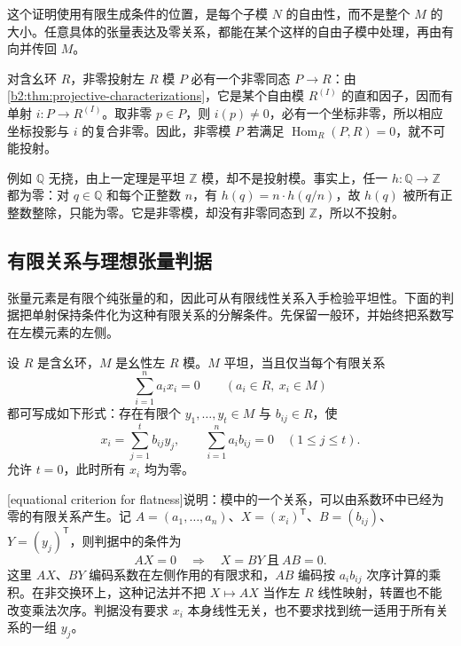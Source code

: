这个证明使用有限生成条件的位置，是每个子模 \(N\) 的自由性，而不是整个 \(M\) 的大小。任意具体的张量表达及零关系，都能在某个这样的自由子模中处理，再由有向并传回 \(M\)。

\ProseParagraphBreak
对含幺环 \(R\)，非零投射左 \(R\) 模 \(P\) 必有一个非零同态 \(P\to R\)：由\cref{b2:thm:projective-characterizations}，它是某个自由模 \(R^{(I)}\) 的直和因子，因而有单射 \(i:P\to R^{(I)}\)。取非零 \(p\in P\)，则 \(i(p)\ne0\)，必有一个坐标非零，所以相应坐标投影与 \(i\) 的复合非零。因此，非零模 \(P\) 若满足 \(\operatorname{Hom}_R(P,R)=0\)，就不可能投射。

\ProseParagraphBreak
例如 \(\mathbb Q\) 无挠，由上一定理是平坦 \(\mathbb Z\) 模，却不是投射模。事实上，任一 \(h:\mathbb Q\to\mathbb Z\) 都为零：对 \(q\in\mathbb Q\) 和每个正整数 \(n\)，有 \(h(q)=n\cdot h(q/n)\)，故 \(h(q)\) 被所有正整数整除，只能为零。它是非零模，却没有非零同态到 \(\mathbb Z\)，所以不投射。

\subsection{有限关系与理想张量判据}
\label{b2:subsec:0703:04}

张量元素是有限个纯张量的和，因此可从有限线性关系入手检验平坦性。下面的判据把单射保持条件化为这种有限关系的分解条件。先保留一般环，并始终把系数写在左模元素的左侧。

\begin{theorem}[有限关系判据]\label{b2:thm:flat-finite-relations}
	设 \(R\) 是含幺环，\(M\) 是幺性左 \(R\) 模。\(M\) 平坦，当且仅当每个有限关系
	\[
		\sum_{i=1}^n a_i x_i=0\qquad(a_i\in R,\ x_i\in M)
	\]
	都可写成如下形式：存在有限个 \(y_1,\ldots,y_t\in M\) 与 \(b_{ij}\in R\)，使
	\begin{equation}\label{b2:eq:flat-relation-factorization}
		x_i=\sum_{j=1}^t b_{ij}y_j,\qquad \sum_{i=1}^n a_i b_{ij}=0\quad(1\le j\le t).
	\end{equation}
	允许 \(t=0\)，此时所有 \(x_i\) 均为零。
\end{theorem}

[equational criterion for flatness]说明：模中的一个关系，可以由系数环中已经为零的有限关系产生。记 \(A=(a_1,\ldots,a_n)\)、\(X=(x_i)^{\mathsf T}\)、\(B=(b_{ij})\)、\(Y=(y_j)^{\mathsf T}\)，则判据中的条件为
\[
	AX=0\quad\Longrightarrow\quad X=BY\ \text{且}\ AB=0.
\]
这里 \(AX\)、\(BY\) 编码系数在左侧作用的有限求和，\(AB\) 编码按 \(a_i b_{ij}\) 次序计算的乘积。在非交换环上，这种记法并不把 \(X\mapsto AX\) 当作左 \(R\) 线性映射，转置也不能改变乘法次序。判据没有要求 \(x_i\) 本身线性无关，也不要求找到统一适用于所有关系的一组 \(y_j\)。

